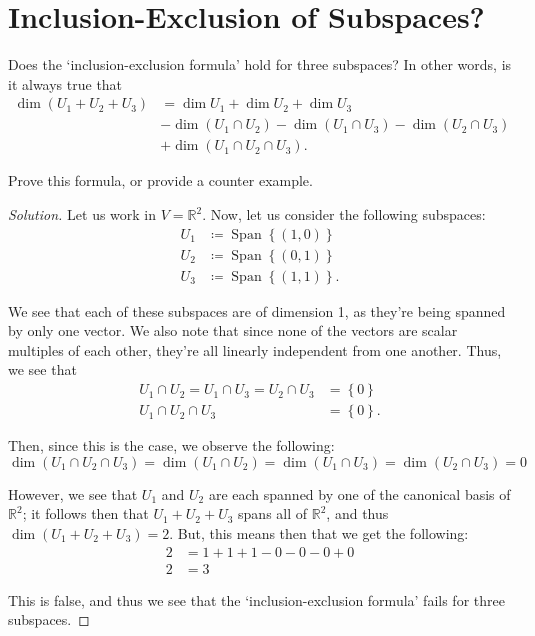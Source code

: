 \documentclass{article}
\newenvironment{solution}{\begin{proof}[Solution]}{\end{proof}}
\newcommand{\RR}{\mathbb{R}}
\DeclareMathOperator*{\Span}{Span}
\begin{document}
	\newpage
	
	\section{Inclusion-Exclusion of Subspaces?}
	\begin{hw}
		Does the `inclusion-exclusion formula' hold for three subspaces? In other words, is it always true that
		\begin{align*}
			\dim(U_{1} + U_{2} + U_{3}) &=\dim U_{1} + \dim U_{2} + \dim U_{3} \\
			&-\dim (U_{1} \cap U_{2}) - \dim (U_{1} \cap U_{3}) - \dim (U_{2} \cap U_{3}) \\
			&+\dim(U_{1} \cap U_{2} \cap U_{3}).
		\end{align*}
	
		Prove this formula, or provide a counter example.
	\end{hw}
	\begin{solution}
		Let us work in $V = \RR^{2}$. Now, let us consider the following subspaces:
		\begin{align*}
			U_{1} &\coloneq \Span\left\{  (1,0) \right\} \\
			U_{2} &\coloneq \Span\left\{  (0,1) \right\} \\
			U_{3} &\coloneq \Span\left\{  (1,1) \right\}.
		\end{align*}
	
		We see that each of these subspaces are of dimension 1, as they're being spanned by only one vector. We also note that since none of the vectors are scalar multiples of each other, they're all linearly independent from one another. Thus, we see that
		\begin{align*}
			U_{1} \cap U_{2} = U_{1} \cap U_{3} = U_{2} \cap U_{3} &= \left\{  0 \right\} \\
			U_{1} \cap U_{2} \cap U_{3} &= \left\{  0 \right\}.
		\end{align*}
	
		Then, since this is the case, we observe the following:
		\begin{equation*}
			\dim (U_{1} \cap U_{2} \cap U_{3}) =\dim (U_{1} \cap U_{2}) = \dim (U_{1} \cap U_{3}) = \dim (U_{2} \cap U_{3}) = 0
		\end{equation*}
	
		However, we see that $U_{1}$ and $U_{2}$ are each spanned by one of the canonical basis of $\RR^{2}$; it follows then that $U_{1} + U_{2} + U_{3}$ spans all of $\RR^{2}$, and thus $\dim (U_{1} + U_{2} + U_{3}) = 2$. But, this means then that we get the following:
		\begin{align*}
			2 &= 1 + 1 + 1 - 0 - 0 - 0 + 0 \\
			2 &= 3
		\end{align*}
	
		This is false, and thus we see that the `inclusion-exclusion formula' fails for three subspaces.
	\end{solution}
\end{document}
